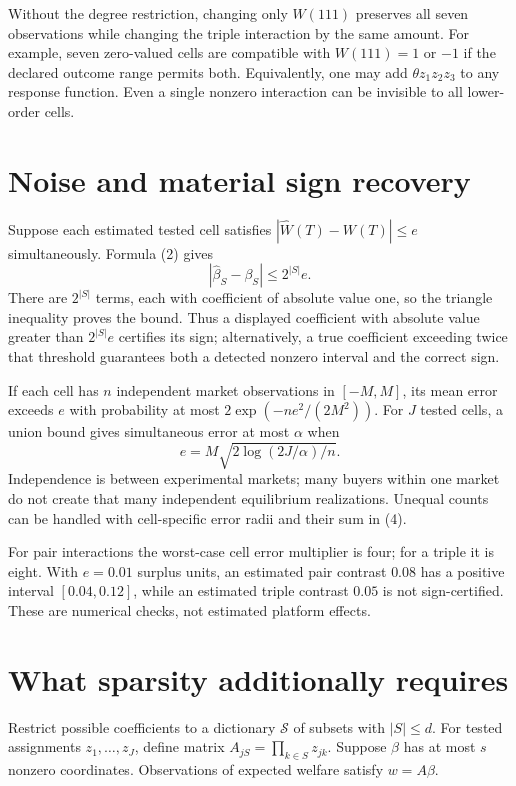 \documentclass[11pt,a4paper]{article}
\begin{document}
Without the degree restriction, changing only $W(111)$ preserves all seven observations while changing the triple interaction by the same amount. For example, seven zero-valued cells are compatible with $W(111)=1$ or $-1$ if the declared outcome range permits both. Equivalently, one may add $\theta z_1z_2z_3$ to any response function. Even a single nonzero interaction can be invisible to all lower-order cells.
\section{Noise and material sign recovery}
Suppose each estimated tested cell satisfies
$|\widehat W(T)-W(T)|\le e$ simultaneously. Formula (2) gives
\[
 |\widehat\beta_S-\beta_S|\le2^{|S|}e.
 \tag{4}
\]
There are $2^{|S|}$ terms, each with coefficient of absolute value one, so the triangle inequality proves the bound. Thus a displayed coefficient with absolute value greater than $2^{|S|}e$ certifies its sign; alternatively, a true coefficient exceeding twice that threshold guarantees both a detected nonzero interval and the correct sign.

If each cell has $n$ independent market observations in $[-M,M]$, its mean error exceeds $e$ with probability at most $2\exp(-ne^2/(2M^2))$. For $J$ tested cells, a union bound gives simultaneous error at most $\alpha$ when
\[
 e=M\sqrt{2\log(2J/\alpha)/n}.
\]
Independence is between experimental markets; many buyers within one market do not create that many independent equilibrium realizations. Unequal counts can be handled with cell-specific error radii and their sum in (4).

For pair interactions the worst-case cell error multiplier is four; for a triple it is eight. With $e=0.01$ surplus units, an estimated pair contrast $0.08$ has a positive interval $[0.04,0.12]$, while an estimated triple contrast $0.05$ is not sign-certified. These are numerical checks, not estimated platform effects.
\section{What sparsity additionally requires}
Restrict possible coefficients to a dictionary $\mathcal S$ of subsets with $|S|\le d$. For tested assignments $z_1,\ldots,z_J$, define matrix
$A_{jS}=\prod_{k\in S}z_{jk}$. Suppose $\beta$ has at most $s$ nonzero coordinates. Observations of expected welfare satisfy $w=A\beta$.
\end{document}
